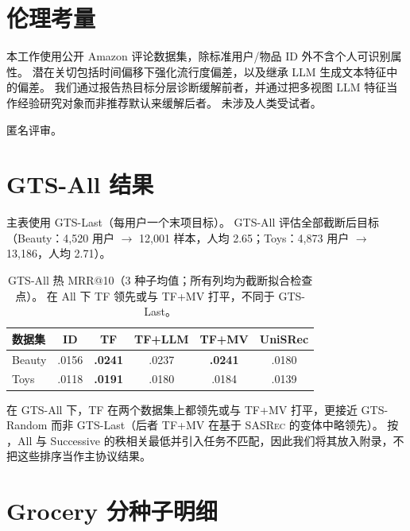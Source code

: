 \documentclass[sigconf,natbib=true,anonymous]{acmart}
\newcommand{\tfmv}{\textsc{TF+MV}\xspace}
\newcommand{\base}{\textsc{SASRec}\xspace}
\begin{document}
\section*{伦理考量}
本工作使用公开 Amazon 评论数据集，除标准用户/物品 ID 外不含个人可识别属性。
潜在关切包括时间偏移下强化流行度偏差，以及继承 LLM 生成文本特征中的偏差。
我们通过报告热目标分层诊断缓解前者，并通过把多视图 LLM 特征当作经验研究对象而非推荐默认来缓解后者。
未涉及人类受试者。

\begin{acks}
匿名评审。
\end{acks}

\appendix

\section{GTS-All 结果}
\label{app:gts-all}

主表使用 GTS-Last（每用户一个末项目标）。
GTS-All 评估全部截断后目标（Beauty：4{,}520 用户 $\to$ 12{,}001 样本，人均 2.65；Toys：4{,}873 用户 $\to$ 13{,}186，人均 2.71）。

\begin{table}[h]
\centering
\caption{GTS-All 热 MRR@10（3 种子均值；所有列均为截断拟合检查点）。
在 All 下 TF 领先或与 \tfmv 打平，不同于 GTS-Last。}
\label{tab:gts-all}
\small
\begin{tabular}{@{}lccccc@{}}
\toprule
数据集 & ID & TF & TF+LLM & TF+MV & UniSRec \\
\midrule
Beauty & .0156 & \textbf{.0241} & .0237 & \textbf{.0241} & .0180 \\
Toys   & .0118 & \textbf{.0191} & .0180 & .0184 & .0139 \\
\bottomrule
\end{tabular}
\end{table}

在 GTS-All 下，TF 在两个数据集上都领先或与 \tfmv 打平，更接近 GTS-Random 而非 GTS-Last（后者 \tfmv 在基于 \base 的变体中略领先）。
按 \citet{gusak2025time}，All 与 Successive 的秩相关最低并引入任务不匹配，因此我们将其放入附录，不把这些排序当作主协议结果。

\section{Grocery 分种子明细}
\label{app:grocery}
\end{document}
